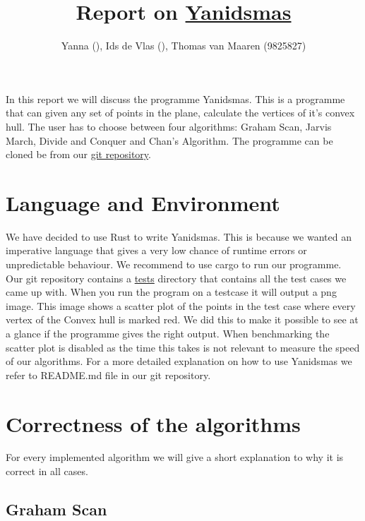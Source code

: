 \documentclass{article}
\title{Report on \href{https://github.com/tvmaaren/GeoAlgBonus-Yanidsmas}{Yanidsmas}}
\author{Yanna \todo{surname} (\todo{student number}), Ids de Vlas (\todo{student number}), Thomas van Maaren (9825827)}
\begin{document}
\maketitle

In this report we will discuss the programme Yanidsmas. This is a programme that can
given any set of points in the plane, calculate the vertices of it's convex hull. The
user has to choose between four algorithms: Graham Scan, Jarvis March, Divide
and Conquer and Chan's Algorithm. The programme can be cloned be from our
\href{https://github.com/tvmaaren/GeoAlgBonus-Yanidsmas}{git repository}.

\section*{Language and Environment}

We have decided to use Rust to write Yanidsmas. This is because we wanted an imperative
language that gives a very low chance of runtime errors or unpredictable behaviour.
We recommend to use cargo to run our programme.
Our git repository contains a \href{https://github.com/tvmaaren/GeoAlgBonus-Yanidsmas/tree/main/tests}{tests} directory that contains all the test cases we came up with.
When you run the program on a testcase it will output a png image. This image shows
a scatter plot of the points in the test case where every vertex of the Convex hull is
marked red. We did this to make it possible to see at a glance if the programme gives
the right output. When benchmarking the scatter plot is disabled as the
time this takes is not relevant to measure the speed of our algorithms. For a more
detailed explanation on how to use Yanidsmas we refer to README.md file in our git repository.

\section*{Correctness of the algorithms}

For every implemented algorithm we will give a short explanation to why it is correct in
all cases.

\subsection*{Graham Scan}
\end{document}
